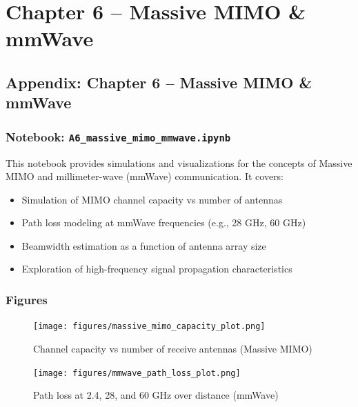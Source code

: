 
\chapter{Chapter 6 – Massive MIMO \& mmWave}

\section{Appendix: Chapter 6 – Massive MIMO \& mmWave}

\subsection{Notebook: \texttt{A6\_massive\_mimo\_mmwave.ipynb}}

This notebook provides simulations and visualizations for the concepts of Massive MIMO and millimeter-wave (mmWave) communication. It covers:

\begin{itemize}
    \item Simulation of MIMO channel capacity vs number of antennas
    \item Path loss modeling at mmWave frequencies (e.g., 28 GHz, 60 GHz)
    \item Beamwidth estimation as a function of antenna array size
    \item Exploration of high-frequency signal propagation characteristics
\end{itemize}

\subsection{Figures}

\begin{figure}[H]
    \centering
    \texttt{[image: figures/massive\_mimo\_capacity\_plot.png]}
    \caption{Channel capacity vs number of receive antennas (Massive MIMO)}
\end{figure}

\begin{figure}[H]
    \centering
    \texttt{[image: figures/mmwave\_path\_loss\_plot.png]}
    \caption{Path loss at 2.4, 28, and 60 GHz over distance (mmWave)}
\end{figure}


